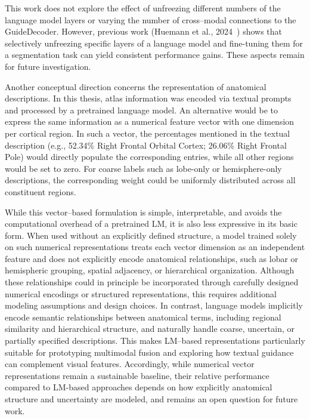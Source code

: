 \documentclass[FCD_GNN.tex]{subfiles}
\begin{document}
This work does not explore the effect of unfreezing different numbers of the
language model layers or varying the number of cross--modal connections to the
GuideDecoder.
However, previous work (Huemann et al., 2024~\cite{Huemann2024ConTEXTualNet})
shows that selectively unfreezing specific layers of a language model and
fine-tuning them for a segmentation task can yield consistent performance gains.
These aspects remain for future investigation.

Another conceptual direction concerns the representation of anatomical descriptions. 
In this thesis, atlas information was encoded via textual prompts and processed by a pretrained language model. 
An alternative would be to express the same information as a numerical feature vector with one dimension per cortical region. 
In such a vector, the percentages mentioned in the textual description (e.g., 52.34\% Right Frontal Orbital Cortex; 26.06\% Right Frontal Pole) would directly populate the corresponding entries, while all other regions would be set to zero. 
For coarse labels such as lobe-only or hemisphere-only descriptions, the corresponding weight could be uniformly distributed across all constituent regions.

While this vector--based formulation is simple, interpretable, and avoids the computational overhead of a pretrained LM, it is also less expressive in its basic form. 
When used without an explicitly defined structure, a model trained solely on such numerical representations treats each vector dimension as an independent feature and does not explicitly encode anatomical relationships, such as lobar or hemispheric grouping, spatial adjacency, or hierarchical organization. 
Although these relationships could in principle be incorporated through carefully designed numerical encodings or structured representations, this requires additional modeling assumptions and design choices.
In contrast, language models implicitly encode semantic relationships between anatomical terms, including regional similarity and hierarchical structure, and naturally handle coarse, uncertain, or partially specified descriptions. 
This makes LM--based representations particularly suitable for prototyping multimodal fusion and exploring how textual guidance can complement visual features. 
Accordingly, while numerical vector representations remain a sustainable baseline, their relative performance compared to LM-based approaches depends on how explicitly anatomical structure and uncertainty are modeled, and remains an open question for future work.
\end{document}
